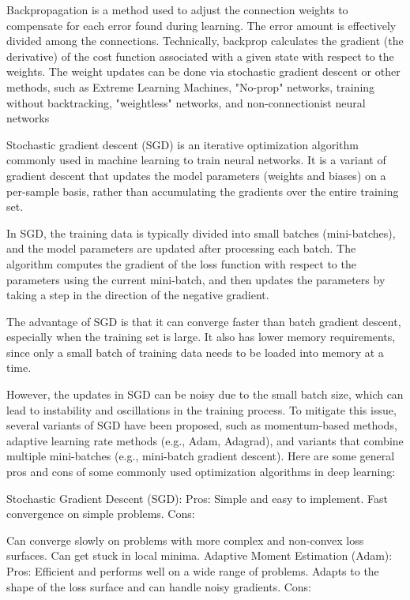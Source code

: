 Backpropagation is a method used to adjust the connection weights to compensate for each error found during learning. The error amount is effectively divided among the connections. Technically, backprop calculates the gradient (the derivative) of the cost function associated with a given state with respect to the weights. The weight updates can be done via stochastic gradient descent or other methods, such as Extreme Learning Machines, "No-prop" networks, training without backtracking, "weightless" networks, and non-connectionist neural networks

Stochastic gradient descent (SGD) is an iterative optimization algorithm commonly used in machine learning to train neural networks. It is a variant of gradient descent that updates the model parameters (weights and biases) on a per-sample basis, rather than accumulating the gradients over the entire training set.

In SGD, the training data is typically divided into small batches (mini-batches), and the model parameters are updated after processing each batch. The algorithm computes the gradient of the loss function with respect to the parameters using the current mini-batch, and then updates the parameters by taking a step in the direction of the negative gradient.

The advantage of SGD is that it can converge faster than batch gradient descent, especially when the training set is large. It also has lower memory requirements, since only a small batch of training data needs to be loaded into memory at a time.

However, the updates in SGD can be noisy due to the small batch size, which can lead to instability and oscillations in the training process. To mitigate this issue, several variants of SGD have been proposed, such as momentum-based methods, adaptive learning rate methods (e.g., Adam, Adagrad), and variants that combine multiple mini-batches (e.g., mini-batch gradient descent).
Here are some general pros and cons of some commonly used optimization algorithms in deep learning:

Stochastic Gradient Descent (SGD):
Pros:
Simple and easy to implement.
Fast convergence on simple problems.
Cons:

Can converge slowly on problems with more complex and non-convex loss surfaces.
Can get stuck in local minima.
Adaptive Moment Estimation (Adam):
Pros:
Efficient and performs well on a wide range of problems.
Adapts to the shape of the loss surface and can handle noisy gradients.
Cons:

